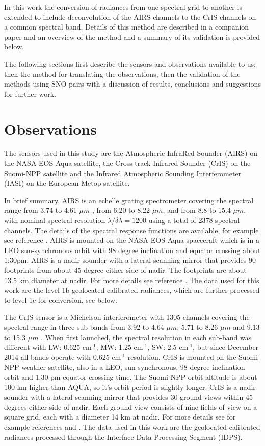 \documentclass[twocolumn,10pt]{article}
\begin{document}
In this work the conversion of radiances from one spectral grid to another is extended to include deconvolution of the AIRS channels to the CrIS channels on a common spectral band. Details of this method are described in a companion paper \cite{Motteler2017a} and an overview of the method and a summary of its validation is provided below. 

The following sections first describe the sensors and observations available to us; then the method for translating the observations, then the validation of the methods using SNO pairs with a discussion of results, conclusions and suggestions for further work.

\section{Observations}
\label{sec:orgheadline3}

The sensors used in this study are the Atmospheric InfraRed Sounder (AIRS) on the NASA EOS Aqua satellite, the Cross-track Infrared Sounder (CrIS) on the Suomi-NPP satellite and the Infrared Atmospheric Sounding Interferometer (IASI) on the European Metop satellite.

In brief summary, AIRS is an echelle grating spectrometer covering the spectral range from 3.74 to 4.61 \(\mu m\) , from 6.20 to 8.22 \(\mu m\), and from 8.8 to 15.4 \(\mu m\), with nominal spectral resolution \(\lambda/\delta\lambda= 1200\) using a total of 2378 spectral channels. The details of the spectral response functions are available, for example see reference \cite{airscalib}. AIRS is mounted on the NASA EOS Aqua spacecraft which is in a LEO sun-synchronous orbit with 98 degree inclination and equator crossing about 1:30pm. AIRS is a nadir sounder with a lateral scanning mirror that provides 90 footprints from about 45 degree either side of nadir. The footprints are about 13.5 km diameter at nadir. For more details see reference \cite{airseos}. The data used for this work are the level 1b geolocated calibrated radiances, which are further processed to level 1c for conversion, see below.

The CrIS sensor is a Michelson interferometer with 1305 channels covering the spectral range in three sub-bands from 3.92 to 4.64 \(\mu m\), 5.71 to 8.26 \(\mu m\) and 9.13 to 15.3 \(\mu m\) . When first launched, the spectral resolution in each sub-band was different with LW: 0.625 cm\(^{\text{-1}}\), MW: 1.25 cm\(^{\text{-1}}\), SW: 2.5 cm\(^{\text{-1}}\), but since December 2014 all bands operate with 0.625 cm\(^{\text{-1}}\) resolution. CrIS is mounted on the Suomi-NPP weather satellite, also in a LEO, sun-synchronous, 98-degree inclination orbit and 1:30 pm equator crossing time. The Suomi-NPP orbit altitude is about 100 km higher than AQUA, so it's orbit period is slightly longer. CrIS is a nadir sounder with a lateral scanning mirror that provides 30 ground views within 45 degrees either side of nadir. Each ground view consists of nine fields of view on a square grid, each with a diameter 14 km at nadir. For more details see for example references \cite{crisweb} and \cite{criscal}. The data used in this work are the geolocated calibrated radiances processed through the Interface Data Processing Segment (IDPS).
\end{document}
